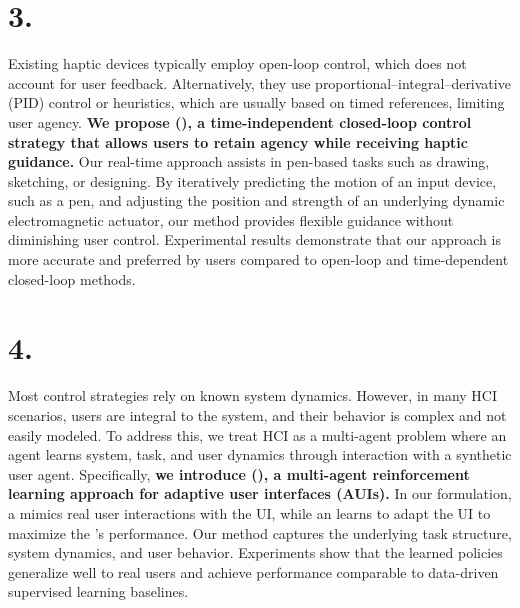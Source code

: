 \section*{3. \magpenTitle}
Existing haptic devices typically employ open-loop control, which does not account for user feedback. Alternatively, they use proportional–integral–derivative (PID) control or heuristics, which are usually based on timed references, limiting user agency. \textbf{We propose \magpen (), a time-independent closed-loop control strategy that allows users to retain agency while receiving haptic guidance.} Our real-time approach assists in pen-based tasks such as drawing, sketching, or designing. By iteratively predicting the motion of an input device, such as a pen, and adjusting the position and strength of an underlying dynamic electromagnetic actuator, our method provides flexible guidance without diminishing user control. Experimental results demonstrate that our approach is more accurate and preferred by users compared to open-loop and time-dependent closed-loop methods.
\section*{4. \marluiTitle}
Most control strategies rely on known system dynamics. However, in many HCI scenarios, users are integral to the system, and their behavior is complex and not easily modeled. To address this, we treat HCI as a multi-agent problem where an agent learns system, task, and user dynamics through interaction with a synthetic user agent. Specifically, \textbf{we introduce \marlui (), a multi-agent reinforcement learning approach for adaptive user interfaces (AUIs).} In our formulation, a \useragent mimics real user interactions with the UI, while an \interfaceagent learns to adapt the UI to maximize the \useragent's performance. Our method captures the underlying task structure, system dynamics, and user behavior. Experiments show that the learned policies generalize well to real users and achieve performance comparable to data-driven supervised learning baselines.